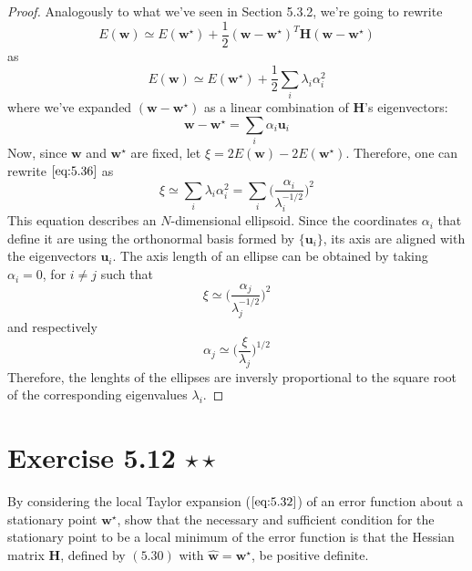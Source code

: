 \vspace{1em}

\begin{proof}
    Analogously to what we've seen in Section 5.3.2, we're going
    to rewrite 
    \begin{equation}\label{eq:5.32}\tag{5.32}
        E(\mathbf{w}) \simeq E(\mathbf{w}^\star) + 
        \frac{1}{2}(\mathbf{w} - \mathbf{w}^\star)^T\mathbf{H}(\mathbf{w} - \mathbf{w}^\star)
    \end{equation}
    as 
    \begin{equation}\label{eq:5.36}\tag{5.36}
        E(\mathbf{w}) \simeq E(\mathbf{w}^\star) + \frac{1}{2} \sum_{i} \lambda_i \alpha_i^2 
    \end{equation}
    where we've expanded $(\mathbf{w} - \mathbf{w}^\star)$ as a linear combination
    of $\mathbf{H}$'s eigenvectors:
    \begin{equation}\label{eq:5.35}\tag{5.35}
       \mathbf{w} - \mathbf{w}^\star = \sum_{i} \alpha_i \mathbf{u}_i  
    \end{equation}
    Now, since $\mathbf{w}$ and $\mathbf{w}^\star$ are fixed, let 
    $\xi = 2E(\mathbf{w}) - 2E(\mathbf{w}^\star)$.
    Therefore, one can rewrite $\eqref{eq:5.36}$ as
     \[
         \xi \simeq \sum_{i} \lambda_i\alpha_i^2 
         = \sum_{i} \bigg(\frac{\alpha_i}{\lambda_i^{-1/2}} \bigg)^2
    \] 
    This equation describes an $N$-dimensional ellipsoid. Since
    the coordinates $\alpha_i$ that define it are using the orthonormal
    basis formed by $\{\mathbf{u}_i\}$, its axis are aligned with
    the eigenvectors $\mathbf{u}_i$. The axis length of an
    ellipse can be obtained by taking $\alpha_i = 0$, for
    $i \neq j$ such that
     \[
         \xi \simeq \bigg(\frac{\alpha_j}{\lambda_j^{-1/2}}\bigg)^2
    \] 
    and respectively
    \[
        \alpha_j \simeq \bigg(\frac{\xi}{\lambda_j}\bigg)^{1/2}
    \] 
    Therefore, the lenghts of the ellipses are inversly proportional
    to the square root of the corresponding eigenvalues $\lambda_i$.
\end{proof}

\section*{Exercise 5.12 $\star \star$}
By considering the local Taylor expansion ($\ref{eq:5.32}$) of
an error function about a stationary point $\mathbf{w}^\star$, show
that the necessary and sufficient condition for the stationary point to be 
a local minimum of the error function is that the Hessian matrix
$\mathbf{H}$, defined by $(5.30)$ with $\widehat{\mathbf{w}} = \mathbf{w}^\star$,
be positive definite.

